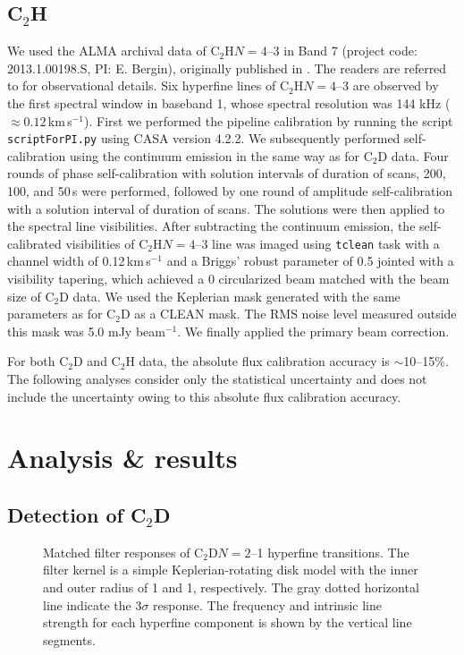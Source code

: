 \documentclass[linenumbers, twocolumn, times]{aastex631}
\newcommand{\CCH}{C$_2$H\xspace}
\newcommand{\CCD}{C$_2$D\xspace}
\begin{document}
\subsection{C$_2$H}
We used the ALMA archival data of \CCH $N=4$--3 in Band 7 (project code: 2013.1.00198.S, PI: E. Bergin), originally published in \citet{Bergin2016}. The readers are referred to \citet{Bergin2016} for observational details. Six hyperfine lines of \CCH $N=4$--3 are observed by the first spectral window in baseband 1, whose spectral resolution was 144 kHz (${\approx}0.12$\,km\,s$^{-1}$). First we performed the pipeline calibration by running the script \texttt{scriptForPI.py} using CASA version 4.2.2. We subsequently performed self-calibration using the continuum emission in the same way as for \CCD data. Four rounds of phase self-calibration with solution intervals of duration of scans, 200, 100, and 50\,s were performed, followed by one round of amplitude self-calibration with a solution interval of duration of scans. The solutions were then applied to the spectral line visibilities. After subtracting the continuum emission, the self-calibrated visibilities of \CCH $N=4$--3 line was imaged using \texttt{tclean} task with a channel width of 0.12\,km\,s$^{-1}$ and a Briggs' robust parameter of 0.5 jointed with a visibility tapering, which achieved a 0 circularized beam matched with the beam size of \CCD data. We used the Keplerian mask generated with the same parameters as for \CCD as a CLEAN mask. The RMS noise level measured outside this mask was 5.0 mJy beam$^{-1}$. We finally applied the primary beam correction.

For both \CCD and \CCH data, the absolute flux calibration accuracy is ${\sim}$10--15\%. The following analyses consider only the statistical uncertainty and does not include the uncertainty owing to this absolute flux calibration accuracy.


\section{Analysis \& results} \label{sec:analysis}

\subsection{Detection of \CCD}
\begin{figure}
\caption{Matched filter responses of \CCD $N=2$--1 hyperfine transitions. The filter kernel is a simple Keplerian-rotating disk model with the inner and outer radius of 1 and 1, respectively. The gray dotted horizontal line indicate the $3\sigma$ response. The frequency and intrinsic line strength for each hyperfine component is shown by the vertical line segments.}
\label{fig:abundance_comparison}
\end{figure}
\end{document}
